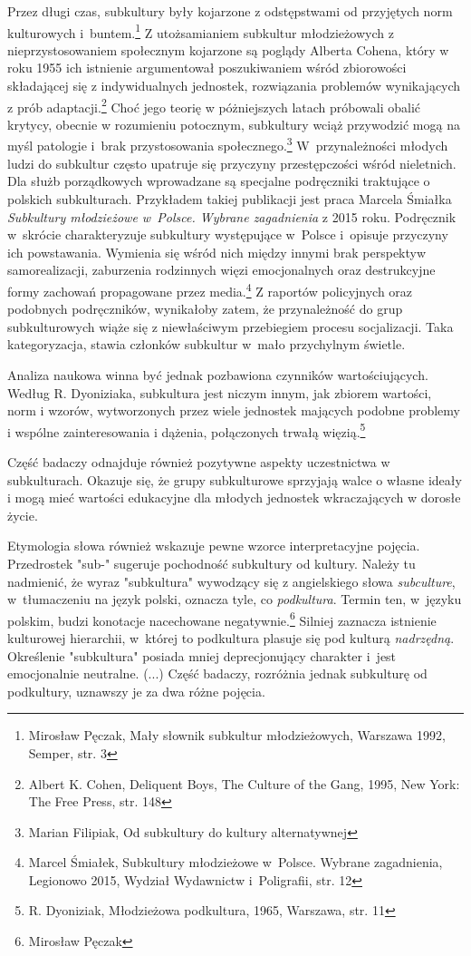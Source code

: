 \documentclass[12pt, a4paper, titlepage]{report}
\begin{document}
Przez długi czas, subkultury były kojarzone z odstępstwami od przyjętych norm kulturowych i~buntem.\footnote{Mirosław Pęczak, Mały słownik subkultur młodzieżowych, Warszawa 1992, Semper, str. 3} Z utożsamianiem subkultur młodzieżowych z nieprzystosowaniem społecznym kojarzone są poglądy Alberta Cohena, który w roku 1955 ich istnienie argumentował poszukiwaniem wśród zbiorowości składającej się z indywidualnych jednostek, rozwiązania problemów wynikających z prób adaptacji.\footnote{Albert K. Cohen, Deliquent Boys, The Culture of the Gang, 1995, New York: The Free Press, str. 148} Choć jego teorię w póżniejszych latach próbowali obalić krytycy, obecnie w rozumieniu potocznym, subkultury wciąż przywodzić mogą na myśl patologie i~brak przystosowania społecznego.\footnote{Marian Filipiak, Od subkultury do kultury alternatywnej} W~przynależności młodych ludzi do subkultur często upatruje się przyczyny przestępczości wśród nieletnich. Dla służb porządkowych wprowadzane są specjalne podręczniki traktujące o polskich subkulturach. Przykładem takiej publikacji jest praca Marcela Śmiałka \textit{Subkultury młodzieżowe w~Polsce. Wybrane zagadnienia} z 2015 roku. Podręcznik w~skrócie charakteryzuje subkultury występujące w~Polsce i~opisuje przyczyny ich powstawania. Wymienia się wśród nich między innymi brak perspektyw samorealizacji, zaburzenia rodzinnych więzi emocjonalnych oraz destrukcyjne formy zachowań propagowane przez media.\footnote{Marcel Śmiałek, Subkultury młodzieżowe w~Polsce. Wybrane zagadnienia, Legionowo 2015, Wydział Wydawnictw i~Poligrafii, str. 12} Z raportów policyjnych oraz podobnych podręczników, wynikałoby zatem, że przynależność do grup subkulturowych wiąże się z niewłaściwym przebiegiem procesu socjalizacji. Taka kategoryzacja, stawia członków subkultur w~mało przychylnym świetle. 

Analiza naukowa winna być jednak pozbawiona czynników wartościujących. 
Według R. Dyoniziaka, subkultura jest niczym innym, jak zbiorem wartości, norm i wzorów, wytworzonych przez wiele jednostek mających podobne problemy i wspólne zainteresowania i dążenia, połączonych trwałą więzią.\footnote{R. Dyoniziak, Młodzieżowa podkultura, 1965, Warszawa, str. 11}

Część badaczy odnajduje również pozytywne aspekty uczestnictwa w subkulturach. Okazuje się, że grupy subkulturowe sprzyjają walce o własne ideały i mogą mieć wartości edukacyjne dla młodych jednostek wkraczających w dorosłe życie. 

Etymologia słowa również wskazuje pewne wzorce interpretacyjne pojęcia. Przedrostek "sub-" sugeruje pochodność subkultury od kultury.   Należy tu nadmienić, że wyraz "subkultura" wywodzący się z angielskiego słowa \textit{subculture}, w~tłumaczeniu na język polski, oznacza tyle, co \textit{podkultura}. Termin ten, w~języku polskim, budzi konotacje nacechowane negatywnie.\footnote{Mirosław Pęczak} Silniej zaznacza istnienie kulturowej hierarchii, w~której to podkultura plasuje się pod kulturą \textit{nadrzędną}. Określenie "subkultura" posiada mniej deprecjonujący charakter i~jest emocjonalnie neutralne. (...) Część badaczy, rozróżnia jednak subkulturę od podkultury, uznawszy je za dwa różne pojęcia. %
\end{document}
